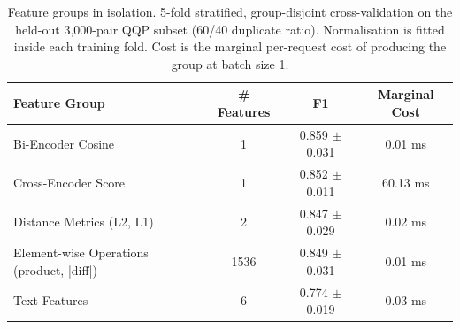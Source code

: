 \begin{table}[htbp]
\centering
\caption{Feature groups in isolation. 5-fold stratified, group-disjoint cross-validation on the held-out 3,000-pair QQP subset (60/40 duplicate ratio). Normalisation is fitted inside each training fold. Cost is the marginal per-request cost of producing the group at batch size 1.}
\label{tab:ablation_isolation}
\begin{tabular}{lccc}
\toprule
\textbf{Feature Group} & \textbf{\# Features} & \textbf{F1} & \textbf{Marginal Cost} \\
\midrule
Bi-Encoder Cosine & 1 & 0.859 $\pm$ 0.031 & 0.01 ms \\
Cross-Encoder Score & 1 & 0.852 $\pm$ 0.011 & 60.13 ms \\
Distance Metrics (L2, L1) & 2 & 0.847 $\pm$ 0.029 & 0.02 ms \\
Element-wise Operations (product, |diff|) & 1536 & 0.849 $\pm$ 0.031 & 0.01 ms \\
Text Features & 6 & 0.774 $\pm$ 0.019 & 0.03 ms \\
\bottomrule
\end{tabular}
\end{table}

